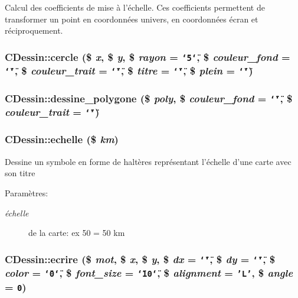Calcul des coefficients de mise \`{a} l'\'{e}chelle. Ces coefficients permettent de transformer un point en coordonn\'{e}es univers, en coordonn\'{e}es \'{e}cran et r\'{e}ciproquement.\hypertarget{classCDessin_a16}{
\subsubsection[cercle]{\setlength{\rightskip}{0pt plus 5cm}CDessin::cercle (\$ {\em x}, \$ {\em y}, \$ {\em rayon} = {\tt \char`\"{}5\char`\"{}}, \$ {\em couleur\_\-fond} = {\tt \char`\"{}\char`\"{}}, \$ {\em couleur\_\-trait} = {\tt \char`\"{}\char`\"{}}, \$ {\em titre} = {\tt \char`\"{}\char`\"{}}, \$ {\em plein} = {\tt \char`\"{}\char`\"{}})}}
\label{classCDessin_a16}


\hypertarget{classCDessin_a13}{
\subsubsection[dessine\_\-polygone]{\setlength{\rightskip}{0pt plus 5cm}CDessin::dessine\_\-polygone (\$ {\em poly}, \$ {\em couleur\_\-fond} = {\tt \char`\"{}\char`\"{}}, \$ {\em couleur\_\-trait} = {\tt \char`\"{}\char`\"{}})}}
\label{classCDessin_a13}


\hypertarget{classCDessin_a10}{
\subsubsection[echelle]{\setlength{\rightskip}{0pt plus 5cm}CDessin::echelle (\$ {\em km})}}
\label{classCDessin_a10}


Dessine un symbole en forme de halt\`{e}res repr\'{e}sentant l'\'{e}chelle d'une carte avec son titre \begin{Desc}
\item[Param\`{e}tres:]
\begin{description}
\item[{\em \'{e}chelle}]de la carte: ex 50 = 50 km\end{description}
\end{Desc}
\hypertarget{classCDessin_a19}{
\subsubsection[ecrire]{\setlength{\rightskip}{0pt plus 5cm}CDessin::ecrire (\$ {\em mot}, \$ {\em x}, \$ {\em y}, \$ {\em dx} = {\tt \char`\"{}\char`\"{}}, \$ {\em dy} = {\tt \char`\"{}\char`\"{}}, \$ {\em color} = {\tt \char`\"{}0\char`\"{}}, \$ {\em font\_\-size} = {\tt \char`\"{}10\char`\"{}}, \$ {\em alignment} = {\tt 'L'}, \$ {\em angle} = {\tt 0})}}
\label{classCDessin_a19}


